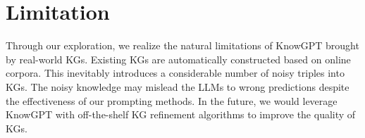 \documentclass{article}
\theoremstyle{boldremark}
\begin{document}
\begin{table}[ht]
\begin{minipage}[b]{0.45\linewidth}
	
\end{minipage}
\vspace{-5mm}
\end{table}




\section{Limitation}\label{sec:discussion_limitation}
Through our exploration, we realize the natural limitations of KnowGPT brought by real-world KGs. Existing KGs are automatically constructed based on online corpora. This inevitably introduces a considerable number of noisy triples into KGs. The noisy knowledge may mislead the LLMs to wrong predictions despite the effectiveness of our prompting methods. In the future, we would leverage KnowGPT with off-the-shelf KG refinement algorithms to improve the quality of KGs.

\end{document}
